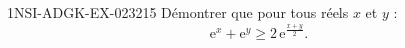 \begin{exercice}{1NSI-ADGK-EX-023}{2}{15}
Démontrer que pour tous réels $x$ et $y$ :
\[ \mathrm{e}^x + \mathrm{e}^y \geq 2\,\mathrm{e}^{\frac{x+y}{2}}. \]

\end{exercice}
